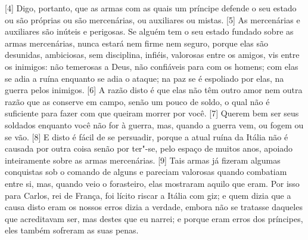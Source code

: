 {[}4{]} Digo, portanto, que as armas com as quais um príncipe defende o
seu estado ou são próprias ou são mercenárias, ou auxiliares ou mistas.
{[}5{]} As mercenárias e auxiliares são inúteis e perigosas. Se alguém
tem o seu estado fundado sobre as armas mercenárias, nunca estará nem
firme nem seguro, porque elas são desunidas, ambiciosas, sem disciplina,
infiéis, valorosas entre os amigos, vis entre os inimigos: não temerosas
a Deus, não confiáveis para com os homens; com elas se adia a ruína
enquanto se adia o ataque; na paz se é espoliado por elas, na guerra
pelos inimigos. {[}6{]} A razão disto é que elas não têm outro amor nem
outra razão que as conserve em campo, senão um pouco de soldo, o qual
não é suficiente para fazer com que queiram morrer por você. {[}7{]}
Querem bem ser seus soldados enquanto você não for à guerra, mas, quando
a guerra vem, ou fogem ou se vão. {[}8{]} E disto é fácil de se
persuadir, porque a atual ruína da Itália não é causada por outra coisa
senão por ter"-se, pelo espaço de muitos anos, apoiado inteiramente sobre
as armas mercenárias. {[}9{]} Tais armas já fizeram algumas conquistas
sob o comando de alguns e
pareciam valorosas quando combatiam entre si, mas, quando veio o
forasteiro, elas mostraram aquilo que
eram. Por isso para Carlos, rei de França, foi lícito riscar a
Itália com giz; e quem dizia que a
causa disto eram os nossos erros dizia a verdade, embora não se tratasse
daqueles que acreditavam ser, mas destes que eu narrei; e porque eram
erros dos príncipes, eles também sofreram as suas penas.

